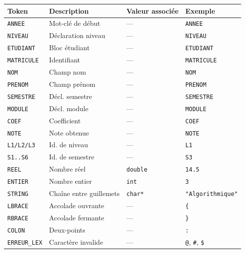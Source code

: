 \documentclass[a4paper,12pt]{article}
\begin{document}
\begin{center}
\begin{tabular}{llll}
\toprule
\textbf{Token} & \textbf{Description} & \textbf{Valeur associée} & \textbf{Exemple} \\
\midrule
\texttt{ANNEE}     & Mot-clé de début    & —           & \texttt{ANNEE} \\
\texttt{NIVEAU}    & Déclaration niveau  & —           & \texttt{NIVEAU} \\
\texttt{ETUDIANT}  & Bloc étudiant       & —           & \texttt{ETUDIANT} \\
\texttt{MATRICULE} & Identifiant         & —           & \texttt{MATRICULE} \\
\texttt{NOM}       & Champ nom           & —           & \texttt{NOM} \\
\texttt{PRENOM}    & Champ prénom        & —           & \texttt{PRENOM} \\
\texttt{SEMESTRE}  & Décl. semestre      & —           & \texttt{SEMESTRE} \\
\texttt{MODULE}    & Décl. module        & —           & \texttt{MODULE} \\
\texttt{COEF}      & Coefficient         & —           & \texttt{COEF} \\
\texttt{NOTE}      & Note obtenue        & —           & \texttt{NOTE} \\
\texttt{L1/L2/L3}  & Id. de niveau       & —           & \texttt{L1} \\
\texttt{S1..S6}    & Id. de semestre     & —           & \texttt{S3} \\
\texttt{REEL}      & Nombre réel         & \texttt{double} & \texttt{14.5} \\
\texttt{ENTIER}    & Nombre entier       & \texttt{int}    & \texttt{3} \\
\texttt{STRING}    & Chaîne entre guillemets & \texttt{char*} & \texttt{"Algorithmique"} \\
\texttt{LBRACE}    & Accolade ouvrante   & —           & \texttt{\{} \\
\texttt{RBRACE}    & Accolade fermante   & —           & \texttt{\}} \\
\texttt{COLON}     & Deux-points         & —           & \texttt{:} \\
\texttt{ERREUR\_LEX} & Caractère invalide & —         & \texttt{@}, \texttt{\#}, \texttt{\$} \\
\bottomrule
\end{tabular}
\end{center}
\end{document}
